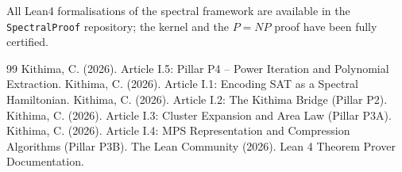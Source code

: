 \documentclass[11pt,a4paper]{article}
\begin{document}
All Lean4 formalisations of the spectral framework are available in the \texttt{SpectralProof} repository; the kernel and the \(P = NP\) proof have been fully certified.

\begin{thebibliography}{99}
  Kithima, C. (2026). Article I.5: Pillar P4 – Power Iteration and Polynomial Extraction.
  Kithima, C. (2026). Article I.1: Encoding SAT as a Spectral Hamiltonian.
  Kithima, C. (2026). Article I.2: The Kithima Bridge (Pillar P2).
  Kithima, C. (2026). Article I.3: Cluster Expansion and Area Law (Pillar P3A).
  Kithima, C. (2026). Article I.4: MPS Representation and Compression Algorithms (Pillar P3B).
  The Lean Community (2026). Lean 4 Theorem Prover Documentation.
\end{thebibliography}
\end{document}
